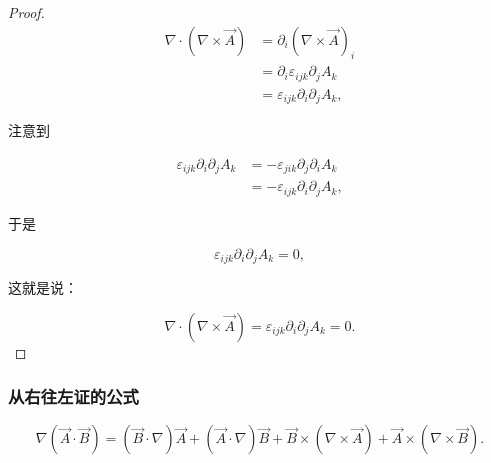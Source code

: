 \begin{proof}

\begin{equation}
\begin{split}
\nabla\cdot\left(\nabla\times \vec{A}\right)
&=\partial_i \left(\nabla\times\vec{A}\right)_i \\
&=\partial_i \varepsilon_{ijk} \partial_j A_k \\
&=\varepsilon_{ijk}\partial_i\partial_j A_k,
\end{split}
\end{equation}

注意到

\begin{equation}
\begin{split}
\varepsilon_{ijk}\partial_i\partial_j A_k
&=-\varepsilon_{jik}\partial_j\partial_i A_k \\
&=-\varepsilon_{ijk}\partial_i\partial_j A_k,
\end{split}
\end{equation}

于是

\begin{equation}
\varepsilon_{ijk}\partial_i\partial_j A_k
=0,
\end{equation}

这就是说：

\begin{equation}
\nabla\cdot\left(\nabla\times \vec{A}\right)
=\varepsilon_{ijk}\partial_i\partial_j A_k
=0.
\end{equation}
\end{proof}

\subsubsection{从右往左证的公式}

\begin{example}
\begin{equation}
\nabla\left(\vec{A}\cdot\vec{B}\right)
=\left(\vec{B}\cdot \nabla\right)\vec{A}+\left(\vec{A}\cdot\nabla\right)\vec{B}+\vec{B}\times\left(\nabla\times\vec{A}\right)+\vec{A}\times\left(\nabla\times\vec{B}\right).
\end{equation}
\end{example}

